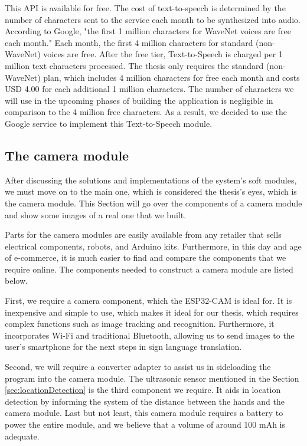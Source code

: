 This API is available for free. The cost of text-to-speech is determined by the number of characters sent to the service each month to be synthesized into audio. According to Google, "the first 1 million characters for WaveNet voices are free each month." Each month, the first 4 million characters for standard (non-WaveNet) voices are free. After the free tier, Text-to-Speech is charged per 1 million text characters processed. The thesis only requires the standard (non-WaveNet) plan, which includes 4 million characters for free each month and costs USD 4.00 for each additional 1 million characters. The number of characters we will use in the upcoming phases of building the application is negligible in comparison to the 4 million free characters. As a result, we decided to use the Google service to implement this Text-to-Speech module.

\subsection{The camera module}

After discussing the solutions and implementations of the system's soft modules, we must move on to the main one, which is considered the thesis's eyes, which is the camera module. This Section will go over the components of a camera module and show some images of a real one that we built.

Parts for the camera modules are easily available from any retailer that sells electrical components, robots, and Arduino kits. Furthermore, in this day and age of e-commerce, it is much easier to find and compare the components that we require online. The components needed to construct a camera module are listed below.

First, we require a camera component, which the ESP32-CAM is ideal for. It is inexpensive and simple to use, which makes it ideal for our thesis, which requires complex functions such as image tracking and recognition. Furthermore, it incorporates Wi-Fi and traditional Bluetooth, allowing us to send images to the user's smartphone for the next steps in sign language translation.

Second, we will require a converter adapter to assist us in sideloading the program into the camera module. The ultrasonic sensor mentioned in the Section \ref{sec:locationDetection} is the third component we require. It aids in location detection by informing the system of the distance between the hands and the camera module. Last but not least, this camera module requires a battery to power the entire module, and we believe that a volume of around 100 mAh is adequate.

